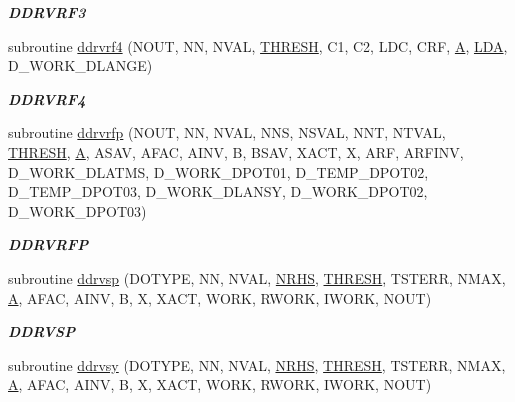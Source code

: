 \begin{DoxyCompactItemize}
\begin{DoxyCompactList}\small\item\em {\bfseries D\+D\+R\+V\+R\+F3} \end{DoxyCompactList}\item 
subroutine \hyperlink{group__double__lin_gada81e7735e21ac0cc4206dd23ba45ecd}{ddrvrf4} (N\+O\+U\+T, N\+N, N\+V\+A\+L, \hyperlink{zlaqgs_8c_a0656018abfc9fa2821827415f5d5ea57}{T\+H\+R\+E\+S\+H}, C1, C2, L\+D\+C, C\+R\+F, \hyperlink{classA}{A}, \hyperlink{example__user_8c_ae946da542ce0db94dced19b2ecefd1aa}{L\+D\+A}, D\+\_\+\+W\+O\+R\+K\+\_\+\+D\+L\+A\+N\+G\+E)
\begin{DoxyCompactList}\small\item\em {\bfseries D\+D\+R\+V\+R\+F4} \end{DoxyCompactList}\item 
subroutine \hyperlink{group__double__lin_gaaa30d2f5a26c0f1efd26275e60d5468f}{ddrvrfp} (N\+O\+U\+T, N\+N, N\+V\+A\+L, N\+N\+S, N\+S\+V\+A\+L, N\+N\+T, N\+T\+V\+A\+L, \hyperlink{zlaqgs_8c_a0656018abfc9fa2821827415f5d5ea57}{T\+H\+R\+E\+S\+H}, \hyperlink{classA}{A}, A\+S\+A\+V, A\+F\+A\+C, A\+I\+N\+V, B, B\+S\+A\+V, X\+A\+C\+T, X, A\+R\+F, A\+R\+F\+I\+N\+V, D\+\_\+\+W\+O\+R\+K\+\_\+\+D\+L\+A\+T\+M\+S, D\+\_\+\+W\+O\+R\+K\+\_\+\+D\+P\+O\+T01, D\+\_\+\+T\+E\+M\+P\+\_\+\+D\+P\+O\+T02, D\+\_\+\+T\+E\+M\+P\+\_\+\+D\+P\+O\+T03, D\+\_\+\+W\+O\+R\+K\+\_\+\+D\+L\+A\+N\+S\+Y, D\+\_\+\+W\+O\+R\+K\+\_\+\+D\+P\+O\+T02, D\+\_\+\+W\+O\+R\+K\+\_\+\+D\+P\+O\+T03)
\begin{DoxyCompactList}\small\item\em {\bfseries D\+D\+R\+V\+R\+F\+P} \end{DoxyCompactList}\item 
subroutine \hyperlink{group__double__lin_ga26646b5bcce6ae8571517bcdbaba3ab1}{ddrvsp} (D\+O\+T\+Y\+P\+E, N\+N, N\+V\+A\+L, \hyperlink{example__user_8c_aa0138da002ce2a90360df2f521eb3198}{N\+R\+H\+S}, \hyperlink{zlaqgs_8c_a0656018abfc9fa2821827415f5d5ea57}{T\+H\+R\+E\+S\+H}, T\+S\+T\+E\+R\+R, N\+M\+A\+X, \hyperlink{classA}{A}, A\+F\+A\+C, A\+I\+N\+V, B, X, X\+A\+C\+T, W\+O\+R\+K, R\+W\+O\+R\+K, I\+W\+O\+R\+K, N\+O\+U\+T)
\begin{DoxyCompactList}\small\item\em {\bfseries D\+D\+R\+V\+S\+P} \end{DoxyCompactList}\item 
subroutine \hyperlink{group__double__lin_gaf2096438d21990d2982d9f704a1c81c2}{ddrvsy} (D\+O\+T\+Y\+P\+E, N\+N, N\+V\+A\+L, \hyperlink{example__user_8c_aa0138da002ce2a90360df2f521eb3198}{N\+R\+H\+S}, \hyperlink{zlaqgs_8c_a0656018abfc9fa2821827415f5d5ea57}{T\+H\+R\+E\+S\+H}, T\+S\+T\+E\+R\+R, N\+M\+A\+X, \hyperlink{classA}{A}, A\+F\+A\+C, A\+I\+N\+V, B, X, X\+A\+C\+T, W\+O\+R\+K, R\+W\+O\+R\+K, I\+W\+O\+R\+K, N\+O\+U\+T)

\end{DoxyCompactItemize}
